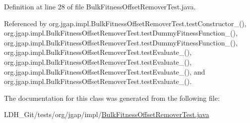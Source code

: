Definition at line 28 of file Bulk\-Fitness\-Offset\-Remover\-Test.\-java.



Referenced by org.\-jgap.\-impl.\-Bulk\-Fitness\-Offset\-Remover\-Test.\-test\-Constructor\-\_(), org.\-jgap.\-impl.\-Bulk\-Fitness\-Offset\-Remover\-Test.\-test\-Dummy\-Fitness\-Function\-\_(), org.\-jgap.\-impl.\-Bulk\-Fitness\-Offset\-Remover\-Test.\-test\-Dummy\-Fitness\-Function\-\_(), org.\-jgap.\-impl.\-Bulk\-Fitness\-Offset\-Remover\-Test.\-test\-Evaluate\-\_(), org.\-jgap.\-impl.\-Bulk\-Fitness\-Offset\-Remover\-Test.\-test\-Evaluate\-\_(), org.\-jgap.\-impl.\-Bulk\-Fitness\-Offset\-Remover\-Test.\-test\-Evaluate\-\_(), and org.\-jgap.\-impl.\-Bulk\-Fitness\-Offset\-Remover\-Test.\-test\-Evaluate\-\_().



The documentation for this class was generated from the following file\-:\begin{DoxyCompactItemize}
\item 
L\-D\-H\-\_\-\-Git/tests/org/jgap/impl/\hyperlink{_bulk_fitness_offset_remover_test_8java}{Bulk\-Fitness\-Offset\-Remover\-Test.\-java}\end{DoxyCompactItemize}
